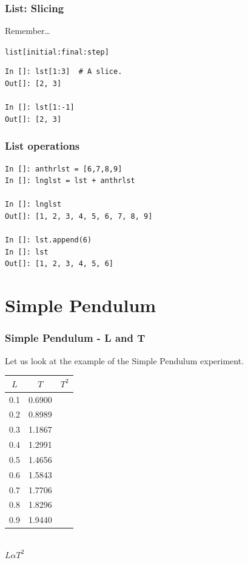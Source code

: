 \documentclass[14pt,compress]{beamer}
\newcounter{time}
\newcommand{\inctime}[1]{\addtocounter{time}{#1}{\tiny \thetime\ m}}
\newcommand{\typ}[1]{\lstinline{#1}}
\newcommand{\kwrd}[1]{ \texttt{\textbf{\color{blue}{#1}}}  }
\begin{document}
\begin{frame}[fragile]
  \frametitle{List: Slicing}
  \begin{block}{Remember\ldots}
	\kwrd{In []: lst = [1,2,3,4,5]}
  \end{block}
\alert{\typ{list[initial:final:step]}}
\begin{lstlisting}
In []: lst[1:3]  # A slice.
Out[]: [2, 3]

In []: lst[1:-1]
Out[]: [2, 3]
\end{lstlisting}
\end{frame}

\begin{frame}[fragile]
\frametitle{List operations}
\begin{lstlisting}
In []: anthrlst = [6,7,8,9]
In []: lnglst = lst + anthrlst

In []: lnglst
Out[]: [1, 2, 3, 4, 5, 6, 7, 8, 9]

In []: lst.append(6)
In []: lst
Out[]: [1, 2, 3, 4, 5, 6]
\end{lstlisting}
\end{frame}

\section{Simple Pendulum}
\begin{frame}[fragile]
\frametitle{Simple Pendulum - L and T}
Let us look at the example of the Simple Pendulum experiment.
\begin{center}
\begin{small}
\begin{tabular}{| c | c | c |}
\hline
$L$ & $T$ & $T^2$ \\ \hline
0.1 & 0.6900 & \\ \hline
0.2 & 0.8989 & \\ \hline
0.3 & 1.1867 & \\ \hline
0.4 & 1.2991 & \\ \hline
0.5 & 1.4656 & \\ \hline
0.6 & 1.5843 & \\ \hline
0.7 & 1.7706 & \\ \hline
0.8 & 1.8296 & \\ \hline
0.9 & 1.9440 & \\ \hline
\end{tabular}
\end{small}\\
\alert{$L \alpha T^2$}
\end{center}
\end{frame}
\end{document}

